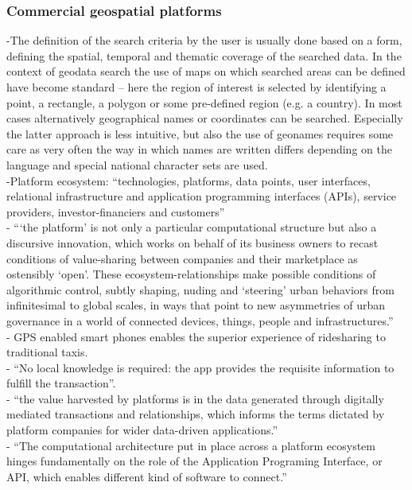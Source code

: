 \subsubsection{Commercial geospatial platforms}
-{\color{orange}The definition of the search criteria by the user is usually done based on a form, defining the spatial, temporal and thematic coverage of the searched data. In the context of geodata search the use of maps on which searched areas can be defined have become standard – here the region of interest is selected by identifying a point, a rectangle, a polygon or some pre-defined region (e.g. a country). In most cases alternatively geographical names or coordinates can be searched. Especially the latter approach is less intuitive, but also the use of geonames requires some care as very often the way in which names are written differs depending on the language and special national character sets are used.\cite{Eisl2020}}\\
-{\color{orange}Platform ecosystem: “technologies, platforms, data points, user interfaces, relational infrastructure and application programming interfaces (APIs), service providers, investor-financiers and customers”\cite{Barns2020}}\\
-{\color{orange} “‘the platform’ is not only a particular computational structure but also a discursive innovation, which works on behalf of its business owners to recast conditions of value-sharing between companies and their marketplace as ostensibly ‘open’. These ecosystem-relationships make possible conditions of algorithmic control, subtly shaping, nuding and ‘steering’ urban behaviors from infinitesimal to global scales, in ways that point to new asymmetries of urban governance in a world of connected devices, things, people and infrastructures.”\cite{Barns2020}}\\
-{\color{orange} GPS enabled smart phones enables the superior experience of ridesharing to traditional taxis.\cite{Barns2020}}\\
-{\color{orange} “No local knowledge is required: the app provides the requisite information to fulfill the transaction”.\cite{Barns2020}}\\
-{\color{orange} “the value harvested by platforms is in the data generated through digitally mediated transactions and relationships, which informs the terms dictated by platform companies for wider data-driven applications.”\cite{Barns2020}}\\
-{\color{orange} “The computational architecture put in place across a platform ecosystem hinges fundamentally on the role of the Application Programing Interface, or API, which enables different kind of software to connect.”\cite{Barns2020}}\\
